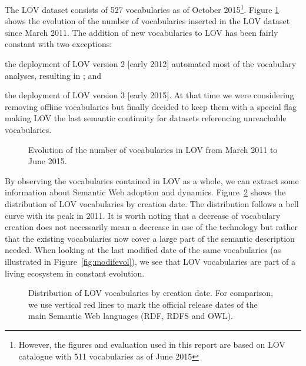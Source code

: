 \documentclass{iosart2c}
\begin{document}
The LOV dataset consists of 527 vocabularies as of October 2015\footnote{However, the figures and evaluation used in this report are based on LOV catalogue with 511 vocabularies as of June 2015}. Figure \ref{fig:evolLOV} shows the evolution of the number of vocabularies inserted in the LOV dataset since March 2011. The addition of new vocabularies to LOV has been fairly constant with two exceptions: 
\begin{inparaenum}[1)] 
	\item the deployment of LOV version 2 [early 2012] automated most of the vocabulary analyses, resulting in ; and
	\item the deployment of LOV version 3 [early 2015]. At that time we were considering removing offline vocabularies but finally decided to keep them with a special flag making LOV the last semantic continuity for datasets referencing unreachable vocabularies.
	
	
	
\end{inparaenum} 


\begin{figure}[htb]
   \resizebox{1.04\linewidth}{!}{}
   \caption{\label{fig:evolLOV} Evolution of the number of vocabularies in LOV from March 2011 to June 2015.
   }
\end{figure}


By observing the vocabularies contained in LOV as a whole, we can extract some information about Semantic Web adoption and dynamics. Figure~\ref{fig:creaevol} shows the distribution of LOV vocabularies by creation date. The distribution follows a bell curve with its peak in 2011. It is worth noting that a decrease of vocabulary creation does not necessarily mean a decrease in use of the technology but rather that the existing vocabularies now cover a large part of the semantic description needed. When looking at the last modified date of the same vocabularies (as illustrated in Figure~\ref{fig:modifevol}), we see that LOV vocabularies are part of a living ecosystem in constant evolution. 

\begin{figure}[htb]
\resizebox{\linewidth}{!}{}
\caption{\label{fig:creaevol} Distribution of LOV vocabularies by creation date. For comparison, we use vertical red lines to mark the official release dates of the main Semantic Web languages (RDF, RDFS and OWL).}
\end{figure}
\end{document}
